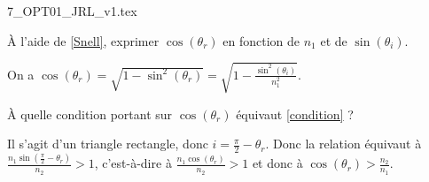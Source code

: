 	\initialisationPartieDroite %
	\begin{center}
		{7_OPT01_JRL_v1.tex}
	\end{center}
	\finalisationDuPartageDePage %
	
	
	\debutEntrainement
	
	
	\begin{enonce}
		À l'aide de \eqref{Snell}, exprimer $\cos(\theta_r)$ en fonction de $n_1$ et de $\sin(\theta_i)$.
	\end{enonce}
	
	
	\begin{corrige}
		On a $\cos(\theta_r)=\sqrt{1-\sin^2(\theta_r)}=\sqrt{1-\frac{\sin^2(\theta_i)}{n_1^2}}$.
	\end{corrige}
	
	
	\begin{enonce}
		À quelle condition portant sur $\cos(\theta_r)$ équivaut \eqref{condition} ?
	\end{enonce}
	
	
	\begin{corrige}
		Il s'agit d'un triangle rectangle, donc $i=\frac{\pi}{2}-\theta_r$. Donc la relation équivaut à $\frac{n_1 \sin(\frac{\pi}{2}-\theta_r)}{n_2}>1$, c'est-à-dire à $\frac{n_1 \cos(\theta_r)}{n_2}>1$ et donc à $\cos(\theta_r)>\frac{n_2}{n_1}$.
	\end{corrige}
	
